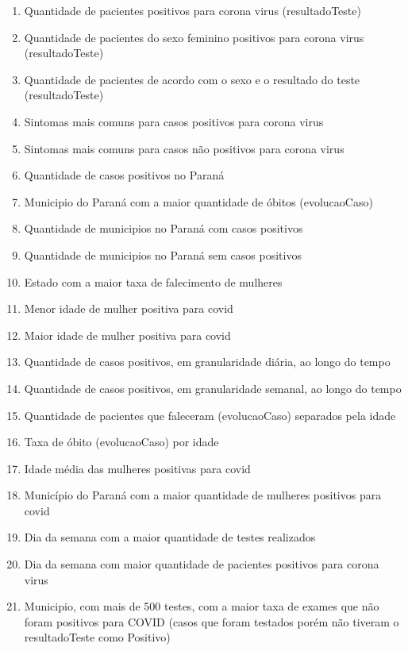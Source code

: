\documentclass[11pt]{article}
\providecommand{\tightlist}{%
      \setlength{\itemsep}{0pt}\setlength{\parskip}{0pt}}
\begin{document}
\begin{enumerate}
\def\labelenumi{\arabic{enumi}.}
\tightlist
\item
  Quantidade de pacientes positivos para corona virus (resultadoTeste)
\item
  Quantidade de pacientes do sexo feminino positivos para corona virus
  (resultadoTeste)
\item
  Quantidade de pacientes de acordo com o sexo e o resultado do teste
  (resultadoTeste)
\item
  Sintomas mais comuns para casos positivos para corona virus
\item
  Sintomas mais comuns para casos não positivos para corona virus
\item
  Quantidade de casos positivos no Paraná
\item
  Municipio do Paraná com a maior quantidade de óbitos (evolucaoCaso)
\item
  Quantidade de municipios no Paraná com casos positivos
\item
  Quantidade de municipios no Paraná sem casos positivos
\item
  Estado com a maior taxa de falecimento de mulheres
\item
  Menor idade de mulher positiva para covid
\item
  Maior idade de mulher positiva para covid
\item
  Quantidade de casos positivos, em granularidade diária, ao longo do
  tempo
\item
  Quantidade de casos positivos, em granularidade semanal, ao longo do
  tempo
\item
  Quantidade de pacientes que faleceram (evolucaoCaso) separados pela
  idade
\item
  Taxa de óbito (evolucaoCaso) por idade
\item
  Idade média das mulheres positivas para covid
\item
  Município do Paraná com a maior quantidade de mulheres positivos para
  covid
\item
  Dia da semana com a maior quantidade de testes realizados
\item
  Dia da semana com maior quantidade de pacientes positivos para corona
  virus
\item
  Municipio, com mais de 500 testes, com a maior taxa de exames que não
  foram positivos para COVID (casos que foram testados porém não tiveram
  o resultadoTeste como Positivo)
\end{enumerate}
\end{document}
